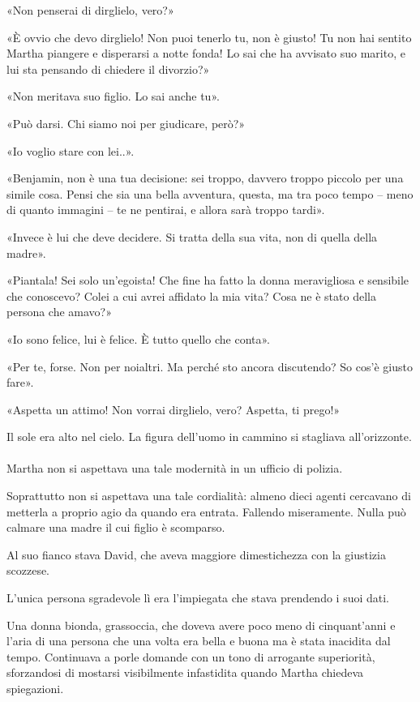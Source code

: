 \documentclass[a4paper,12pt]{book}
\begin{document}
«Non penserai di dirglielo, vero?»

«È ovvio che devo dirglielo! Non puoi tenerlo tu, non è giusto! Tu non hai
sentito Martha piangere e disperarsi a notte fonda! Lo sai che ha avvisato suo
marito, e lui sta pensando di chiedere il divorzio?»

«Non meritava suo figlio. Lo sai anche tu».

«Può darsi. Chi siamo noi per giudicare, però?»

«Io voglio stare con lei..».

«Benjamin, non è una tua decisione: sei troppo, davvero troppo piccolo per una
simile cosa. Pensi che sia una bella avventura, questa, ma tra poco tempo --
meno di quanto immagini -- te ne pentirai, e allora sarà troppo tardi».

«Invece è lui che deve decidere. Si tratta della sua vita, non di quella della
madre».

«Piantala! Sei solo un'egoista! Che fine ha fatto la donna meravigliosa e
sensibile che conoscevo? Colei a cui avrei affidato la mia vita? Cosa ne è
stato della persona che amavo?»

«Io sono felice, lui è felice. È tutto quello che conta».

«Per te, forse. Non per noialtri. Ma perché sto ancora discutendo? So cos'è
giusto fare».

«Aspetta un attimo! Non vorrai dirglielo, vero? Aspetta, ti prego!»

Il sole era alto nel cielo. La figura dell'uomo in cammino si stagliava
all'orizzonte.

\paragraph{}
Martha non si aspettava una tale modernità in un ufficio di polizia.

Soprattutto non si aspettava una tale cordialità: almeno dieci agenti cercavano
di metterla a proprio agio da quando era entrata. Fallendo miseramente. Nulla
può calmare una madre il cui figlio è scomparso.

Al suo fianco stava David, che aveva maggiore dimestichezza con la giustizia
scozzese.

L'unica persona sgradevole lì era l'impiegata che stava prendendo i suoi dati.

Una donna bionda, grassoccia, che doveva avere poco meno di cinquant'anni e
l'aria di una persona che una volta era bella e buona ma è stata inacidita dal
tempo. Continuava a porle domande con un tono di arrogante superiorità,
sforzandosi di mostarsi visibilmente infastidita quando Martha chiedeva
spiegazioni.
\end{document}
